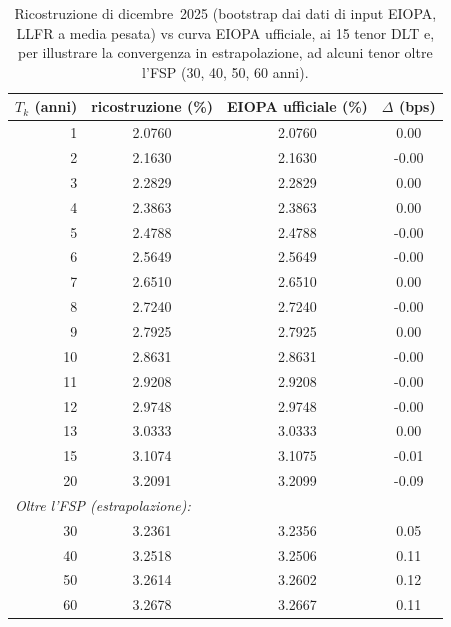\begin{table}[H]\centering\small
\caption{Ricostruzione di dicembre~2025 (bootstrap dai dati di input EIOPA, LLFR a media pesata) vs curva EIOPA ufficiale, ai 15 tenor DLT e, per illustrare la convergenza in estrapolazione, ad alcuni tenor oltre l'FSP (30, 40, 50, 60 anni).}
\label{tab:delta-dic}\renewcommand{\arraystretch}{1.15}
\begin{tabular}{rccc}
\toprule
$T_k$ (anni) & ricostruzione (\%) & EIOPA ufficiale (\%) & $\Delta$ (bps)\\
\midrule
\rowcolor{rowtint}1 & 2.0760 & 2.0760 & 0.00\\
2 & 2.1630 & 2.1630 & -0.00\\
\rowcolor{rowtint}3 & 2.2829 & 2.2829 & 0.00\\
4 & 2.3863 & 2.3863 & 0.00\\
\rowcolor{rowtint}5 & 2.4788 & 2.4788 & -0.00\\
6 & 2.5649 & 2.5649 & -0.00\\
\rowcolor{rowtint}7 & 2.6510 & 2.6510 & 0.00\\
8 & 2.7240 & 2.7240 & -0.00\\
\rowcolor{rowtint}9 & 2.7925 & 2.7925 & 0.00\\
10 & 2.8631 & 2.8631 & -0.00\\
\rowcolor{rowtint}11 & 2.9208 & 2.9208 & -0.00\\
12 & 2.9748 & 2.9748 & -0.00\\
\rowcolor{rowtint}13 & 3.0333 & 3.0333 & 0.00\\
15 & 3.1074 & 3.1075 & -0.01\\
\rowcolor{rowtint}20 & 3.2091 & 3.2099 & -0.09\\
\midrule
\multicolumn{4}{l}{\emph{Oltre l'FSP (estrapolazione):}}\\
\midrule
30 & 3.2361 & 3.2356 & 0.05\\
\rowcolor{rowtint}40 & 3.2518 & 3.2506 & 0.11\\
50 & 3.2614 & 3.2602 & 0.12\\
\rowcolor{rowtint}60 & 3.2678 & 3.2667 & 0.11\\
\bottomrule
\end{tabular}
\end{table}
